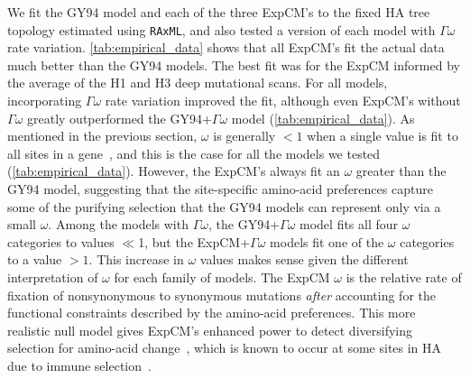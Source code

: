 \documentclass[11pt]{article}
\begin{document}
We fit the GY94 model and each of the three ExpCM's to the fixed HA tree topology estimated using \texttt{RAxML}, and also tested a version of each model with $\Gamma\omega$ rate variation.
\ref{tab:empirical_data} shows that all ExpCM's fit the actual data much better than the GY94 models.
The best fit was for the ExpCM informed by the average of the H1 and H3 deep mutational scans.
For all models, incorporating $\Gamma\omega$ rate variation improved the fit, although even ExpCM's without $\Gamma\omega$ greatly outperformed the GY94+$\Gamma\omega$ model (\ref{tab:empirical_data}).
As mentioned in the previous section, $\omega$ is generally $<1$ when a single value is fit to all sites in a gene~\citep{murrell2015gene}, and this is the case for all the models we tested (\ref{tab:empirical_data}).
However, the ExpCM's always fit an $\omega$ greater than the GY94 model, suggesting that the site-specific amino-acid preferences capture some of the purifying selection that the GY94 models can represent only via a small $\omega$.
Among the models with $\Gamma\omega$, the GY94+$\Gamma\omega$ model fits all four $\omega$ categories to values $\ll$1, but the ExpCM+$\Gamma\omega$ models fit one of the $\omega$ categories to a value $>1$.
This increase in $\omega$ values makes sense given the different interpretation of $\omega$ for each family of models. 
The ExpCM $\omega$ is the relative rate of fixation of nonsynonymous to synonymous mutations \textit{after} accounting for the functional constraints described by the amino-acid preferences.
This more realistic null model gives ExpCM's enhanced power to detect diversifying selection for amino-acid change~\citep{bloom2017identification, rodrigue2017detecting}, which is known to occur at some sites in HA due to immune selection~\citep{bedford2014integrating}.
\end{document}
